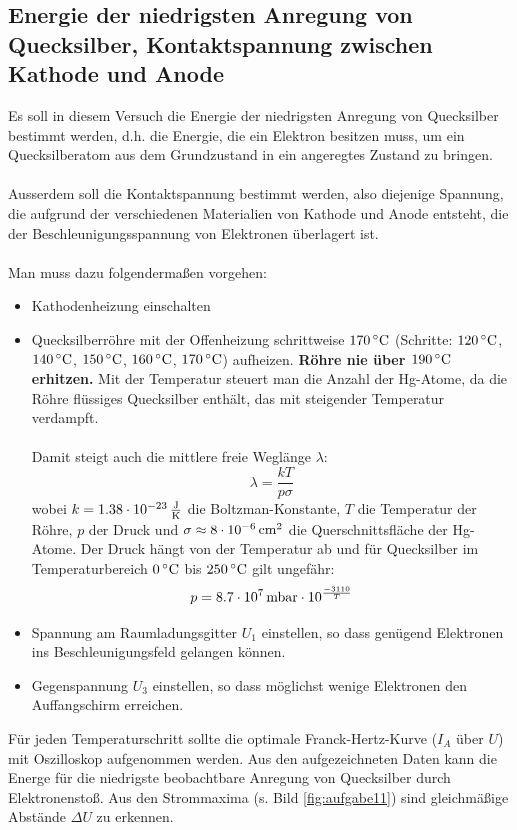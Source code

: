 \documentclass[a4paper,titlepage]{scrartcl}
\numberwithin{equation}{section}
\begin{document}
\subsection{Energie der niedrigsten Anregung von Quecksilber, Kontaktspannung zwischen Kathode und Anode}
Es soll in diesem Versuch die Energie der niedrigsten Anregung von Quecksilber bestimmt werden, d.h. die Energie, die ein Elektron besitzen muss, um ein Quecksilberatom aus dem Grundzustand in ein angeregtes Zustand zu bringen.\\ \\
Ausserdem soll die Kontaktspannung bestimmt werden, also diejenige Spannung, die aufgrund der verschiedenen Materialien von Kathode und Anode entsteht, die der Beschleunigungsspannung von Elektronen überlagert ist.\\ \\
Man muss dazu folgendermaßen vorgehen:
\begin{itemize}
\item Kathodenheizung einschalten
\item Quecksilberröhre mit der Offenheizung schrittweise $\unit[170]{^{\circ}C}$ (Schritte: $\unit[120]{^{\circ}C}$, $\unit[140]{^{\circ}C}$, $\unit[150]{^{\circ}C}$, $\unit[160]{^{\circ}C}$, $\unit[170]{^{\circ}C}$) aufheizen. \textbf{Röhre nie über $\unit[190]{^{\circ} C}$ erhitzen.} Mit der Temperatur steuert man die Anzahl der Hg-Atome, da die Röhre flüssiges Quecksilber enthält, das mit steigender Temperatur verdampft.\\ \\ Damit steigt auch die mittlere freie Weglänge $\lambda$:
\begin{equation}
\lambda=\frac{kT}{p \sigma}
\end{equation}
wobei $k=\unit[1.38 \cdot 10^{-23}]{\frac{J}{K}}$ die Boltzman-Konstante, $T$ die Temperatur der Röhre, $p$ der Druck und $\sigma\approx \unit[8 \cdot 10^{-6}]{cm^2} $ die Querschnittsfläche der Hg-Atome. Der Druck hängt von der Temperatur ab und für Quecksilber im Temperaturbereich $\unit[0]{^{\circ}C}$ bis $\unit[250]{^{\circ}C}$ gilt ungefähr:
\begin{equation}
p=\unit[8.7 \cdot 10^7]{mbar} \cdot 10^{\frac{-3110}{T}}
\end{equation}
\item Spannung am Raumladungsgitter $U_1$ einstellen, so dass genügend Elektronen ins Beschleunigungsfeld gelangen können.
\item Gegenspannung $U_3$ einstellen, so dass möglichst wenige Elektronen den Auffangschirm erreichen.
\end{itemize}
Für jeden Temperaturschritt sollte die optimale Franck-Hertz-Kurve ($I_A$ über $U$) mit Oszilloskop aufgenommen werden. Aus den aufgezeichneten Daten kann die Energe für die niedrigste beobachtbare Anregung von Quecksilber durch Elektronenstoß. Aus den Strommaxima (s. Bild \ref{fig:aufgabe11}) sind gleichmäßige Abstände $\Delta U$ zu erkennen.
\end{document}
